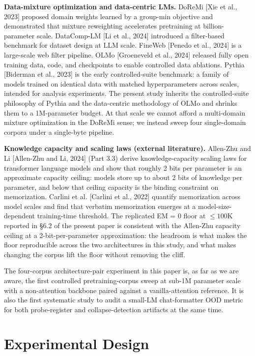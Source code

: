 \documentclass[11pt]{article}
\begin{document}
\textbf{Data-mixture optimization and data-centric LMs.} DoReMi [Xie et al., 2023] proposed domain weights learned by a group-min objective and demonstrated that mixture reweighting accelerates pretraining at billion-parameter scale. DataComp-LM [Li et al., 2024] introduced a filter-based benchmark for dataset design at LLM scale. FineWeb [Penedo et al., 2024] is a large-scale web filter pipeline. OLMo [Groeneveld et al., 2024] released fully open training data, code, and checkpoints to enable controlled data ablations. Pythia [Biderman et al., 2023] is the early controlled-suite benchmark: a family of models trained on identical data with matched hyperparameters across scales, intended for analysis experiments. The present study inherits the controlled-suite philosophy of Pythia and the data-centric methodology of OLMo and shrinks them to a 1M-parameter budget. At that scale we cannot afford a multi-domain mixture optimization in the DoReMi sense; we instead sweep four single-domain corpora under a single-byte pipeline.

\textbf{Knowledge capacity and scaling laws (external literature).} Allen-Zhu and Li [Allen-Zhu and Li, 2024] (Part 3.3) derive knowledge-capacity scaling laws for transformer language models and show that roughly 2 bits per parameter is an approximate capacity ceiling: models store up to about 2 bits of knowledge per parameter, and below that ceiling capacity is the binding constraint on memorization. Carlini et al. [Carlini et al., 2022] quantify memorization across model scales and find that verbatim memorization emerges at a model-size-dependent training-time threshold. The replicated EM = 0 floor at $\leq 100$K reported in \S6.2 of the present paper is consistent with the Allen-Zhu capacity ceiling at a 2-bit-per-parameter approximation: the headroom is what makes the floor reproducible across the two architectures in this study, and what makes changing the corpus lift the floor without removing the cliff.

The four-corpus architecture-pair experiment in this paper is, as far as we are aware, the first controlled pretraining-corpus sweep at sub-1M parameter scale with a non-attention backbone paired against a vanilla-attention reference. It is also the first systematic study to audit a small-LM chat-formatter OOD metric for both probe-register and collapse-detection artifacts at the same time.

\section{Experimental Design}
\end{document}
